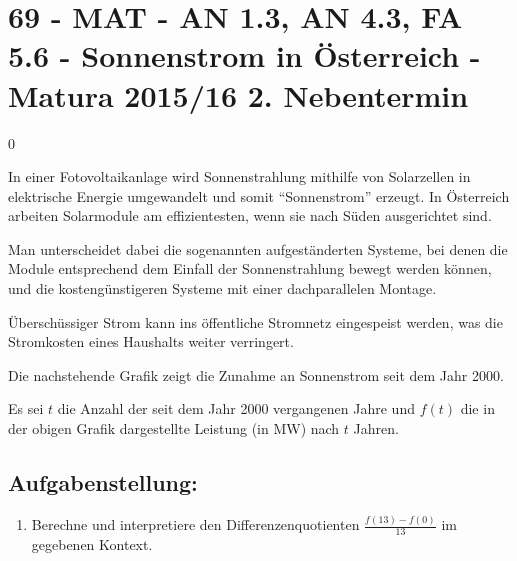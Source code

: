 \section{69 - MAT - AN 1.3, AN 4.3, FA 5.6  - Sonnenstrom in Österreich - Matura 2015/16 2. Nebentermin}

\begin{langesbeispiel} \item[0] %
	
In einer Fotovoltaikanlage wird Sonnenstrahlung mithilfe von Solarzellen in elektrische Energie umgewandelt und somit "`Sonnenstrom"' erzeugt. In Österreich arbeiten Solarmodule am effizientesten, wenn sie nach Süden ausgerichtet sind.\leer

Man unterscheidet dabei die sogenannten aufgeständerten Systeme, bei denen die Module entsprechend dem Einfall der Sonnenstrahlung bewegt werden können, und die kostengünstigeren Systeme mit einer dachparallelen Montage.\leer

Überschüssiger Strom kann ins öffentliche Stromnetz eingespeist werden, was die Stromkosten eines Haushalts weiter verringert.\leer

Die nachstehende Grafik zeigt die Zunahme an Sonnenstrom seit dem Jahr 2000.
\begin{center}
\end{center}

Es sei $t$ die Anzahl der seit dem Jahr 2000 vergangenen Jahre und $f(t)$ die in der obigen Grafik dargestellte Leistung (in MW) nach $t$ Jahren.

\subsection{Aufgabenstellung:}
\begin{enumerate}
	\item {} Berechne und interpretiere den Differenzenquotienten $\frac{f(13)-f(0)}{13}$ im gegebenen Kontext.\leer
	

\end{enumerate}
\end{langesbeispiel}

